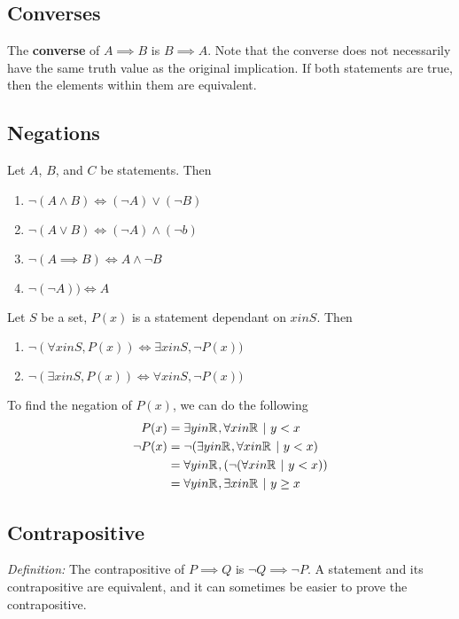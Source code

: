 \documentclass[12pt]{article}
\newcommand{\R}[1]{\mathbb{R}^{#1}}
\begin{document}
\subsection*{Converses}
The {\bf converse} of $A \implies B$ is $B \implies A$. Note that the converse does not necessarily have the same truth value as the original implication. If both statements are true, then the elements within them are equivalent.

\subsection*{Negations}
Let $A$, $B$, and $C$ be statements. Then
\begin{enumerate}
\item $\neg (A \land B) \iff (\neg A) \lor (\neg B)$
\item $\neg (A \lor B) \iff (\neg A) \land (\neg b)$
\item $\neg (A \implies B) \iff A \land \neg B$
\item $\neg (\neg A)) \iff A$
\end{enumerate}

Let $S$ be a set, $P(x)$ is a statement dependant on $x in S$. Then
\begin{enumerate}
\item $\neg (\forall x in S, P(x)) \iff \exists x in S, \neg P(x))$
\item $\neg (\exists x in S, P(x)) \iff \forall x in S, \neg P(x))$
\end{enumerate}

To find the negation of $P(x)$, we can do the following
\begin{align*}
P(x) &= \exists y in \R{}, \forall x in \R{} \suchthat y < x\\
\neg P(x) &= \neg (\exists y in \R{}, \forall x in \R{} \suchthat y < x)\\
&= \forall y in \R{}, (\neg (\forall x in \R{} \suchthat y < x))\\
&= \forall y in \R{}, \exists x in \R{} \suchthat y \geq x
\end{align*}

\subsection*{Contrapositive}
\textit{Definition: } The contrapositive of $P \implies Q$ is $\neg Q \implies \neg P$. A statement and its contrapositive are equivalent, and it can sometimes be easier to prove the contrapositive.
\end{document}
